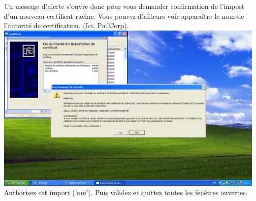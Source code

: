 Un message d'alerte s'ouvre donc pour vous demander confirmation de l'import d'un nouveau certificat racine. Vous pouvez d'ailleurs voir apparaître le nom de l'autorité de certification. (Ici, PoilCorp).\\
\includegraphics[width=\screenShotSize{}]{imgUser/importCacertAuthorize.PNG}\\
Authorisez cet import ('oui').
Puis validez et quittez toutes les fenêtres ouvertes.

